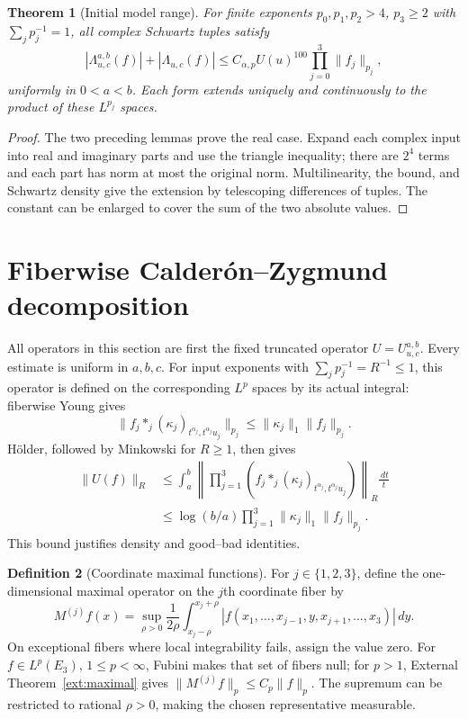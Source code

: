 \documentclass[12pt,reqno]{amsart}
\theoremstyle{plain}
\newtheorem{theorem}{Theorem}[section]
\theoremstyle{definition}
\newtheorem{definition}[theorem]{Definition}
\theoremstyle{remark}
\numberwithin{equation}{section}
\newcommand{\dd}{\,d}
\begin{document}
\begin{theorem}[Initial model range]\label{thm:initial_model}
For finite exponents $p_0,p_1,p_2>4$, $p_3\ge2$ with
$\sum_jp_j^{-1}=1$, all complex Schwartz tuples satisfy
\[
 |\Lambda^{a,b}_{u,c}(f)|+|\Lambda_{u,c}(f)|
 \le C_{\alpha,p}U(u)^{100}\prod_{j=0}^3\|f_j\|_{p_j},
\]
uniformly in $0<a<b$. Each form extends uniquely and continuously
to the product of these $L^{p_j}$ spaces.
\end{theorem}
\begin{proof}
The two preceding lemmas prove the real case. Expand each complex
input into real and imaginary parts and use the triangle inequality;
there are $2^4$ terms and each part has norm at most the original
norm. Multilinearity, the bound, and Schwartz density give the
extension by telescoping differences of tuples. The constant can be
enlarged to cover the sum of the two absolute values.
\end{proof}

\section{Fiberwise Calder\'on--Zygmund decomposition}

All operators in this section are first the fixed truncated operator
$U=U^{a,b}_{u,c}$. Every estimate is uniform in $a,b,c$.
For input exponents with $\sum_jp_j^{-1}=R^{-1}\le1$, this operator
is defined on the corresponding $L^p$ spaces by its actual integral:
fiberwise Young gives
\[
 \|f_j*_j(\kappa_j)_{t^{\alpha_j},t^{\alpha_j}u_j}\|_{p_j}
 \le\|\kappa_j\|_1\|f_j\|_{p_j}.
\]
H\"older, followed by Minkowski for $R\ge1$, then gives
\begin{align*}
 \|U(f)\|_R
 &\le\int_a^b
    \left\|\prod_{j=1}^3
      (f_j*_j(\kappa_j)_{t^{\alpha_j},t^{\alpha_j}u_j})\right\|_R
                                                     \frac{\dd t}{t}\\
 &\le\log(b/a)\prod_{j=1}^3\|\kappa_j\|_1\|f_j\|_{p_j}.
\end{align*}
This bound justifies density and good--bad identities.

\begin{definition}[Coordinate maximal functions]\label{def:fiber_maximal}
For $j\in\{1,2,3\}$, define the one-dimensional maximal operator
on the $j$th coordinate fiber by
\[
 M^{(j)}f(x)=\sup_{\rho>0}\frac1{2\rho}
  \int_{x_j-\rho}^{x_j+\rho}
  |f(x_1,\ldots,x_{j-1},y,x_{j+1},\ldots,x_3)|\dd y.
\]
On exceptional fibers where local integrability fails, assign the
value zero. For $f\in L^p(E_3)$, $1\le p<\infty$, Fubini makes
that set of fibers null; for $p>1$, External
Theorem~\ref{ext:maximal} gives
$\|M^{(j)}f\|_p\le C_p\|f\|_p$. The supremum can be restricted
to rational $\rho>0$, making the chosen representative measurable.
\end{definition}
\end{document}
